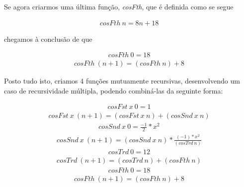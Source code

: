 \documentclass[a4paper]{article}
\begin{document}
Se agora criarmos uma última função, \textit{cosFth}, que é definida como se segue

\begin{eqnarray*}
cosFth\ n = 8n+18
\end{eqnarray*}

chegamos à conclusão de que

\begin{eqnarray*}
cosFth\ 0 = 18
\end{eqnarray*}
\begin{eqnarray*}
cosFth\ (n+1) = (cosFth\ n)+8
\end{eqnarray*}

Posto tudo isto, criamos 4 funções mutuamente recursivas, desenvolvendo um caso de recursividade múltipla, podendo combiná-las da seguinte forma:

\begin{eqnarray*}
cosFst\ x\ 0 = 1
\end{eqnarray*}
\begin{eqnarray*}
cosFst\ x\ (n+1) = (cosFst\ x\ n) + (cosSnd\ x\ n)
\end{eqnarray*}
\begin{eqnarray*}
cosSnd\ x\ 0 = \frac{-1}{2}*x^{2}
\end{eqnarray*}
\begin{eqnarray*}
cosSnd\ x\ (n+1) = (cosSnd\ x\ n)*\frac{(-1)*x^{2}}{(cosTrd\ n)}
\end{eqnarray*}
\begin{eqnarray*}
cosTrd\ 0 = 12
\end{eqnarray*}
\begin{eqnarray*}
cosTrd\ (n+1) = (cosTrd\ n)+(cosFth\ n)
\end{eqnarray*}
\begin{eqnarray*}
cosFth\ 0 = 18
\end{eqnarray*}
\begin{eqnarray*}
cosFth\ (n+1) = (cosFth\ n)+8
\end{eqnarray*}
\end{document}
